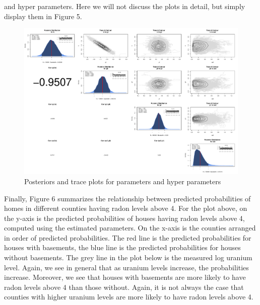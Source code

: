 \documentclass{article}
\def\beginmyfig{\begin{figure}[htbp]\begin{center}}
\def\endmyfig{\end{center}\end{figure}}
\begin{document}
and hyper parameters. Here we will not discuss the plots in detail, but simply display them in Figure 5.\\
\beginmyfig \includegraphics[scale=.3]{images/lhyperPost.pdf} 
            \caption{Posteriors and trace plots for parameters and hyper parameters}\endmyfig 
Finally, Figure 6 summarizes the relationship between predicted probabilities
of homes in different counties having radon levels above 4.  For the plot
above, on the y-axis is the predicted probabilities of houses having radon
levels above 4, computed using the estimated parameters. On the x-axis is the
counties arranged in order of predicted probabilities. The red line is the
predicted probabilities for houses with basements, the blue line is the
predicted probabilities for houses without basements. The grey line in the plot
below is the measured log uranium level. Again, we see in general that as
uranium levels increase, the probabilities increase. Moreover, we see that
houses with basements are more likely to have radon levels above 4 than those
without. Again, it is not always the case that counties with higher uranium
levels are more likely to have radon levels above 4.\\
\end{document}
